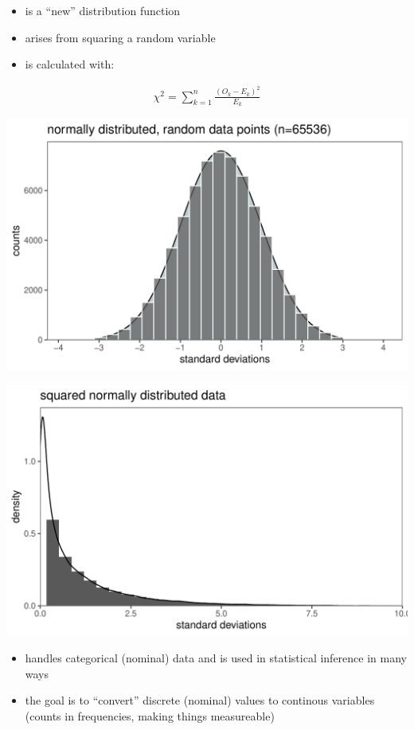 \documentclass[
  a4paper,
]{scrbook}
\providecommand{\tightlist}{%
  \setlength{\itemsep}{0pt}\setlength{\parskip}{0pt}}\usepackage{longtable,booktabs,array}
\begin{document}
\begin{itemize}
\tightlist
\item
  is a ``new'' distribution function
\item
  arises from squaring a random variable
\item
  is calculated with:
\end{itemize}

\begin{align}
\chi^2 = \sum_{k = 1}^n \frac{(O_k - E_k)^2}{E_k}
\end{align}

\includegraphics[width=1\linewidth,height=\textheight,keepaspectratio]{chapter001_Distributions_files/figure-pdf/unnamed-chunk-5-1.pdf}

\includegraphics[width=1\linewidth,height=\textheight,keepaspectratio]{chapter001_Distributions_files/figure-pdf/unnamed-chunk-6-1.pdf}

\begin{itemize}
\tightlist
\item
  handles categorical (nominal) data and is used in statistical
  inference in many ways
\item
  the goal is to ``convert'' discrete (nominal) values to continous
  variables (counts in frequencies, making things measureable)
\end{itemize}
\end{document}
